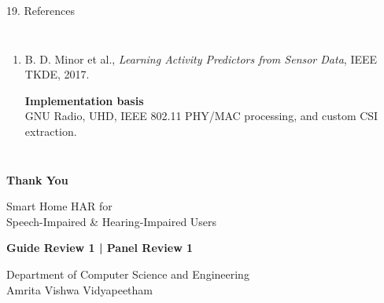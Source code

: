 \documentclass[aspectratio=169,11pt]{beamer}
\begin{document}
\begin{frame}{19. References}
\begin{columns}[T,totalwidth=\textwidth]
\begin{enumerate}
\item B. D. Minor et al.,
\textit{Learning Activity Predictors from Sensor Data},
IEEE TKDE, 2017.

\vspace{0.15cm} %

\textbf{\color{AmritaMaroon}Implementation basis}\\
GNU Radio, UHD, IEEE 802.11 PHY/MAC processing,
and custom CSI extraction.

\end{enumerate}

\end{columns}

\end{frame}

\begin{frame}

\begin{center}

\vspace{1.2cm}

{\Huge\color{AmritaMaroon}\bfseries Thank You}

\vspace{0.5cm}

{\Large
Smart Home HAR for\\
Speech-Impaired \& Hearing-Impaired Users
}

\vspace{0.6cm}

\textbf{Guide Review 1 \;|\; Panel Review 1}

\vspace{0.4cm}

Department of Computer Science and Engineering\\
Amrita Vishwa Vidyapeetham

\end{center}

\end{frame}
\end{document}
